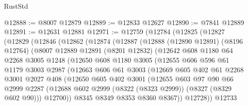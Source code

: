 \begin{lexlean}{RustStd}
\begin{coremodule}
@12888 := @8007 @12879
@12889 := @12833 @12627
@12890 := @7841 @12889
@12891 := @12631 @12881
@12971 := @12759
    (@12784
      (@12825
        (@12827
          (@12829
            (@12846
              (@12862
                (@12874
                  (@12887
                    (@12888
                      (@12890 @12891)
                      (@8196 @12764)
                      (@8007
                        @12889
                        @12891
                        (@8201 @12832)
                        (@12642
                          @608
                          @1180
                          @64
                          @2268
                          @3005
                          @1248
                          (@12650
                            @608
                            @1180
                            @3005
                            (@12655
                              @606
                              @596
                              @61
                              @1179
                              @3003
                              @2987
                              (@12663
                                @606
                                @61
                                @3003
                                (@12669
                                  @605
                                  @402
                                  @61
                                  @2268
                                  @3001
                                  @2027
                                  @408
                                  (@12650
                                    @605
                                    @402
                                    @3001
                                    (@12655
                                      @603
                                      @97
                                      @90
                                      @66
                                      @2999
                                      @2287
                                      (@12688
                                        @602
                                        @2999
                                        (@8322 (@8323 @2999))
                                        (@8327 (@8329 @602 @90)))
                                      @12700))
                                  @8345
                                  @8349
                                  @8353
                                  @8360
                                  @8367))
                              @12728))
                          @12733

\end{coremodule}
\end{lexlean}
